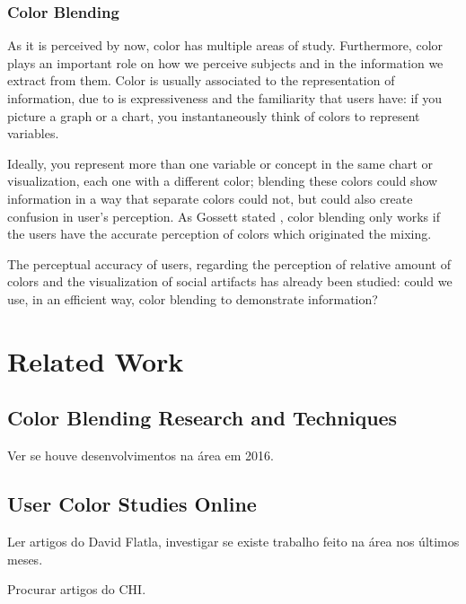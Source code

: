\subsubsection{Color Blending}
%
As it is perceived by now, color has multiple areas of study. Furthermore, color plays an important role
on how we perceive subjects and in the information we extract from them. Color is usually associated to
the representation of information, due to is expressiveness and the familiarity that users have: if you
picture a graph or a chart, you instantaneously think of colors to represent variables. \par
Ideally, you represent more than one variable or concept in the same chart or visualization, each one
with a different color; blending these colors could show information in a way that separate colors could
not, but could also create confusion in user’s perception. As Gossett stated \cite{Gossett2004}, color blending only
works if the users have the accurate perception of colors which originated the mixing. \par
The perceptual accuracy of users, regarding the perception of relative amount of colors and the visualization
of social artifacts has already been studied: could we use, in an efficient way, color blending to demonstrate
information?
%
\section{Related Work}
\label{sec:related_work}
%
\subsection{Color Blending Research and Techniques}
\label{subsec:colorblending}
%
Ver se houve desenvolvimentos na área em 2016. \par
%
\subsection{User Color Studies Online}
\label{subsec:colorstudies}
%
Ler artigos do David Flatla, investigar se existe trabalho feito na área nos últimos meses. \par
Procurar artigos do CHI. \par
%
